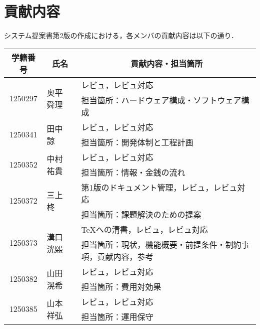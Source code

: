 \chapter{貢献内容}
システム提案書第2版の作成における，各メンバの貢献内容は以下の通り．
\begin{table}[h]
    \centering
    \begin{tabularx}{\textwidth}{cll}
        \multicolumn{1}{c}{学籍番号} & \multicolumn{1}{c}{氏名} & \multicolumn{1}{c}{貢献内容・担当箇所}  \\
        \hline
        \multirow{2}{*}{1250297} & \multirow{2}{*}{奥平 舜理} & レビュ，レビュ対応                      \\
                                 &                        & 担当箇所：ハードウェア構成・ソフトウェア構成         \\
        \hline
        \multirow{2}{*}{1250341} & \multirow{2}{*}{田中 諒}  & レビュ，レビュ対応                      \\
                                 &                        & 担当箇所：開発体制と工程計画                 \\
        \hline
        \multirow{2}{*}{1250352} & \multirow{2}{*}{中村 祐貴} & レビュ，レビュ対応                      \\
                                 &                        & 担当箇所：情報・金銭の流れ                  \\
        \hline
        \multirow{2}{*}{1250372} & \multirow{2}{*}{三上 柊}  & 第1版のドキュメント管理，レビュ，レビュ対応         \\
                                 &                        & 担当箇所：課題解決のための提案                \\
        \hline
        \multirow{2}{*}{1250373} & \multirow{2}{*}{溝口 洸熙} & \TeX への清書，レビュ，レビュ対応            \\
                                 &                        & 担当箇所：現状，機能概要・前提条件・制約事項，貢献内容，参考 \\
        \hline
        \multirow{2}{*}{1250382} & \multirow{2}{*}{山田 滉希} & レビュ，レビュ対応                      \\
                                 &                        & 担当箇所：費用対効果                     \\
        \hline
        \multirow{2}{*}{1250385} & \multirow{2}{*}{山本 祥弘} & レビュ，レビュ対応                      \\
                                 &                        & 担当箇所：運用保守                      \\
        \hline
    \end{tabularx}
\end{table}